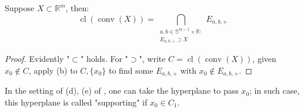 \begin{coro}\label{coro:015-halfspaces-intersection}
	Suppose $X\subset \mathbb{R}^m$, then:
	\[
		\operatorname{cl}(\operatorname{conv}(X))=\bigcap_{\substack{a,b\in \mathbb{S}^{m-1}\times \mathbb{R}:\\E_{a,b,+}\supset X}}E_{a,b,+}
	\]
\end{coro}
\begin{proof}
	Evidently "$\subset$" holds. For "$\supset$", write $C=\operatorname{cl}(\operatorname{conv}(X))$, given $x_0\notin C$, apply (b) to $C,\{x_0\}$ to find some $E_{a,b,+}$ with $x_0\notin E_{a,b,+}$.
\end{proof}

\begin{rmrk}
	In the setting of (d), (e) of , one can take the hyperplane to pass $x_0$; in such case, this hyperplane is called "supporting" if $x_0\in C_1$.
\end{rmrk}
